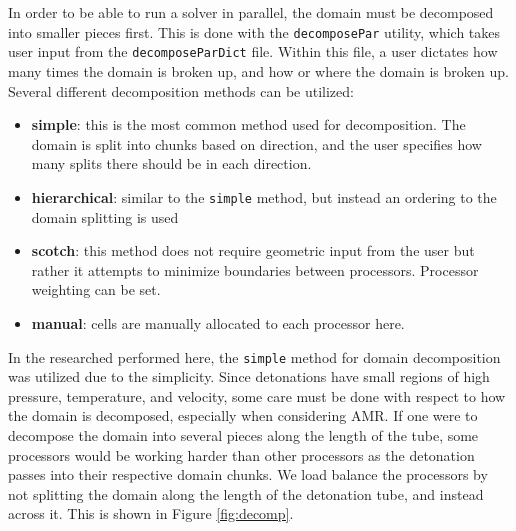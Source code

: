 In order to be able to run a solver in parallel, the domain must be decomposed into smaller pieces first. This is done with the \verb|decomposePar| utility, which takes user input from the \verb|decomposeParDict| file. Within this file, a user dictates how many times the domain is broken up, and how or where the domain is broken up. Several different decomposition methods can be utilized:
\begin{itemize}
\item \textbf{simple}: this is the most common method used for decomposition. The domain is split into chunks based on direction, and the user specifies how many splits there should be in each direction. 
\item \textbf{hierarchical}: similar to the \verb|simple| method, but instead an ordering to the domain splitting is used
\item \textbf{scotch}: this method does not require geometric input from the user but rather it attempts to minimize boundaries between processors. Processor weighting can be set. 
\item \textbf{manual}: cells are manually allocated to each processor here. 
\end{itemize}
In the researched performed here, the \verb|simple| method for domain decomposition was utilized due to the simplicity. Since detonations have small regions of high pressure, temperature, and velocity, some care must be done with respect to how the domain is decomposed, especially when considering AMR. If one were to decompose the domain into several pieces along the length of the tube, some processors would be working harder than other processors as the detonation passes into their respective domain chunks. We load balance the processors by not splitting the domain along the length of the detonation tube, and instead across it. This is shown in Figure \ref{fig:decomp}. 

